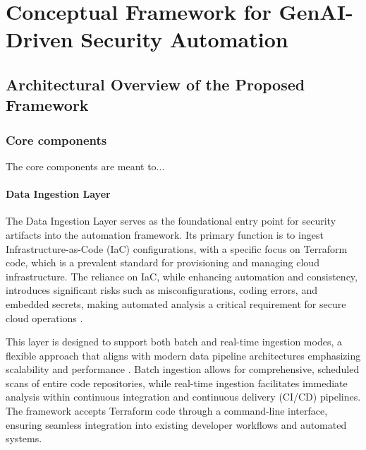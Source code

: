 
\chapter{Conceptual Framework for GenAI-Driven Security Automation} %

\section{Architectural Overview of the Proposed Framework}


\subsection{Core components} %
\label{sub:Core components}

The core components are meant to...

\subsubsection{Data Ingestion Layer} %
\label{sec:Data Ingestion Layer}

The Data Ingestion Layer serves as the foundational entry point for security artifacts into the automation framework. Its primary function is to ingest Infrastructure-as-Code (IaC) configurations, with a specific focus on Terraform code, which is a prevalent standard for provisioning and managing cloud infrastructure. The reliance on IaC, while enhancing automation and consistency, introduces significant risks such as misconfigurations, coding errors, and embedded secrets, making automated analysis a critical requirement for secure cloud operations \cite{hayagreevan_security_2024}.

This layer is designed to support both batch and real-time ingestion modes, a flexible approach that aligns with modern data pipeline architectures emphasizing scalability and performance \cite{ismail_big_2025}. Batch ingestion allows for comprehensive, scheduled scans of entire code repositories, while real-time ingestion facilitates immediate analysis within continuous integration and continuous delivery (CI/CD) pipelines. The framework accepts Terraform code through a command-line interface, ensuring seamless integration into existing developer workflows and automated systems.

